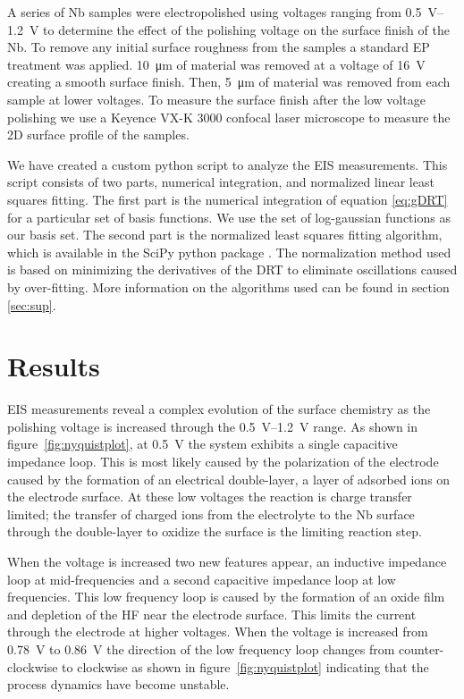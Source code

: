 A series of Nb samples were electropolished using voltages ranging from \qtyrange{0.5}{1.2}{\volt} to determine the effect of the polishing voltage on the surface finish of the Nb. To remove any initial surface roughness from the samples a standard EP treatment was applied. \qty{10}{\micro\meter} of material was removed at a voltage of \qty{16}{\volt} creating a smooth surface finish. Then, \qty{5}{\micro\meter} of material was removed from each sample at lower voltages. To measure the surface finish after the low voltage polishing we use a Keyence VX-K 3000 confocal laser microscope to measure the 2D surface profile of the samples.

We have created a custom python script to analyze the EIS measurements. This script consists of two parts, numerical integration, and normalized linear least squares fitting. The first part is the numerical integration of equation \ref{eq:gDRT} for a particular set of basis functions. We use the set of log-gaussian functions as our basis set. The second part is the normalized least squares fitting algorithm, which is available in the SciPy python package \cite{2020SciPy-NMeth}. The normalization method used is based on minimizing the derivatives of the DRT to eliminate oscillations caused by over-fitting. More information on the algorithms used can be found in section \ref{sec:sup}.



\section{Results}
\label{sec:results}

EIS measurements reveal a complex evolution of the surface chemistry as the polishing voltage is increased through the \qtyrange{0.5}{1.2}{\volt} range. As shown in figure~\ref{fig:nyquistplot}, at \qty{0.5}{\volt} the system exhibits a single capacitive impedance loop. This is most likely caused by the polarization of the electrode caused by the formation of an electrical double-layer, a layer of adsorbed ions on the electrode surface\cite{eliaz2018physical}. At these low voltages the reaction is charge transfer limited; the transfer of charged ions from the electrolyte to the Nb surface through the double-layer to oxidize the surface is the limiting reaction step.

When the voltage is increased two new features appear, an inductive impedance loop at mid-frequencies and a second capacitive impedance loop at low frequencies. This low frequency loop is caused by the formation of an oxide film and depletion of the HF near the electrode surface. This limits the current through the electrode at higher voltages. When the voltage is increased from \qty{0.78}{\volt} to \qty{0.86}{\volt} the direction of the low frequency loop changes from counter-clockwise to clockwise as shown in figure~\ref{fig:nyquistplot} indicating that the process dynamics have become unstable.

